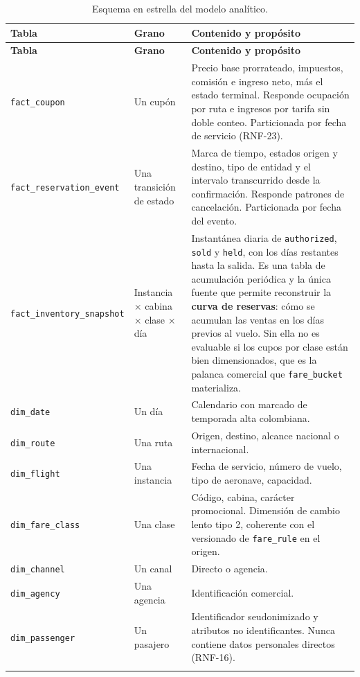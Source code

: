 \documentclass[10pt,letterpaper]{article}
\begin{document}
\begin{longtable}{@{}L{4.4cm} L{3.2cm} L{7.4cm}@{}}
\toprule \textbf{Tabla} & \textbf{Grano} & \textbf{Contenido y propósito} \\ \midrule \endfirsthead
\toprule \textbf{Tabla} & \textbf{Grano} & \textbf{Contenido y propósito} \\ \midrule \endhead
\texttt{fact\_coupon} & Un cupón & Precio base prorrateado, impuestos, comisión e ingreso neto, más el estado terminal. Responde ocupación por ruta e ingresos por tarifa sin doble conteo. Particionada por fecha de servicio (RNF-23). \\
\texttt{fact\_reservation\_event} & Una transición de estado & Marca de tiempo, estados origen y destino, tipo de entidad y el intervalo transcurrido desde la confirmación. Responde patrones de cancelación. Particionada por fecha del evento. \\
\texttt{fact\_inventory\_snapshot} & Instancia $\times$ cabina $\times$ clase $\times$ día & Instantánea diaria de \texttt{authorized}, \texttt{sold} y \texttt{held}, con los días restantes hasta la salida. Es una tabla de acumulación periódica y la única fuente que permite reconstruir la \textbf{curva de reservas}: cómo se acumulan las ventas en los días previos al vuelo. Sin ella no es evaluable si los cupos por clase están bien dimensionados, que es la palanca comercial que \texttt{fare\_bucket} materializa. \\
\texttt{dim\_date} & Un día & Calendario con marcado de temporada alta colombiana. \\
\texttt{dim\_route} & Una ruta & Origen, destino, alcance nacional o internacional. \\
\texttt{dim\_flight} & Una instancia & Fecha de servicio, número de vuelo, tipo de aeronave, capacidad. \\
\texttt{dim\_fare\_class} & Una clase & Código, cabina, carácter promocional. Dimensión de cambio lento tipo 2, coherente con el versionado de \texttt{fare\_rule} en el origen. \\
\texttt{dim\_channel} & Un canal & Directo o agencia. \\
\texttt{dim\_agency} & Una agencia & Identificación comercial. \\
\texttt{dim\_passenger} & Un pasajero & Identificador seudonimizado y atributos no identificantes. Nunca contiene datos personales directos (RNF-16). \\
\bottomrule
\caption{Esquema en estrella del modelo analítico.}
\end{longtable}
\end{document}
